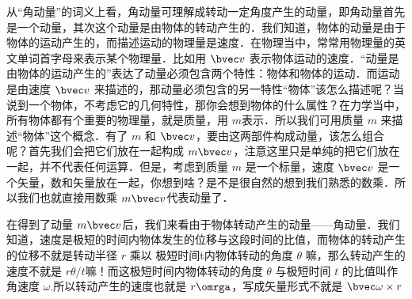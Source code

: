 
从“角动量”的词义上看，角动量可理解成转动一定角度产生的动量，即角动量首先是一个动量，其次这个动量是由物体的转动产生的．我们知道，物体的动量是由于物体的运动产生的，而描述运动的物理量是速度．在物理当中，常常用物理量的英文单词首字母来表示某个物理量．比如用 $\bvec v$ 表示物体运动的速度．“动量是由物体的运动产生的”表达了动量必须包含两个特性：物体和物体的运动．而运动是由速度 $\bvec v$ 来描述的，那动量必须包含的另一特性“物体”该怎么描述呢？当说到一个物体，不考虑它的几何特性，那你会想到物体的什么属性？在力学当中，所有物体都有个重要的物理量，就是质量，用 $m$表示．所以我们可用质量 $m$ 来描述“物体”这个概念．有了 $m$ 和 $\bvec v$，要由这两部件构成动量，该怎么组合呢？首先我们会把它们放在一起构成 $m\bvec v$，注意这里只是单纯的把它们放在一起，并不代表任何运算．但是，考虑到质量 $m$ 是一个标量，速度 $\bvec v$ 是一个矢量，数和矢量放在一起，你想到啥？是不是很自然的想到我们熟悉的数乘．所以我们也就直接用数乘 $m\bvec v$代表动量了．

在得到了动量 $m\bvec v$后，我们来看由于物体转动产生的动量——角动量．我们知道，速度是极短的时间内物体发生的位移与这段时间的比值，而物体的转动产生的位移不就是转动半径 $r$ 乘以 极短时间t内物体转动的角度 $\theta$ 嘛，那么转动产生的速度不就是 $r\theta/t$嘛！而这极短时间内物体转动的角度 $\theta$ 与极短时间 $t$ 的比值叫作角速度 $\omega$.所以转动产生的速度也就是 $r\omrga$，写成矢量形式不就是 $\bvec \omega\times r$